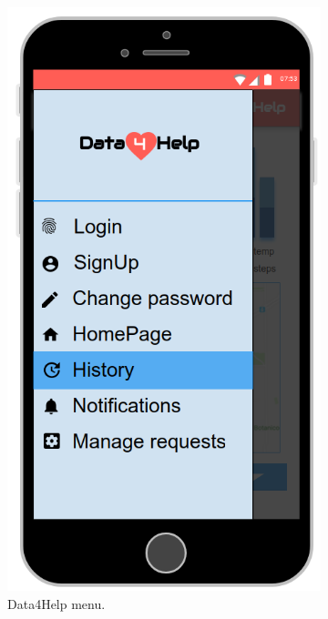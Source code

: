 \begin{figure}[ht]
    \centering
    \begin{subfigure}[t]{0.38\linewidth}
        \includegraphics[width=\linewidth]{images/Mockup/Menu.png}
        \caption{Data4Help menu.}
    \end{subfigure} \hfil \hfil \hfil
    \begin{subfigure}[t]{0.38\linewidth}

\end{subfigure}
\end{figure}
